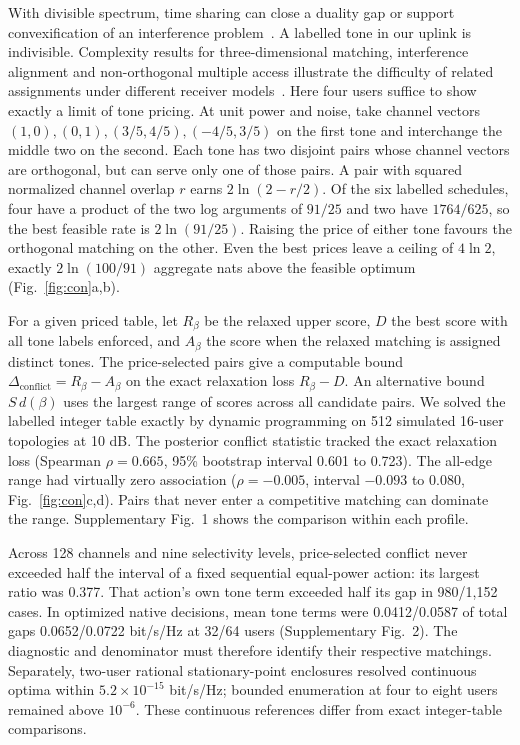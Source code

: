 \documentclass[lineno,pdflatex,sn-nature]{sn-jnl}
\begin{document}
With divisible spectrum, time sharing can close a duality gap or support convexification of an interference problem~\cite{yului,zhaopottie}. A labelled tone in our uplink is indivisible. Complexity results for three-dimensional matching, interference alignment and non-orthogonal multiple access illustrate the difficulty of related assignments under different receiver models~\cite{dyer,razaviyayn,salaun}. Here four users suffice to show exactly a limit of tone pricing. At unit power and noise, take channel vectors \((1,0),(0,1),(3/5,4/5),(-4/5,3/5)\) on the first tone and interchange the middle two on the second. Each tone has two disjoint pairs whose channel vectors are orthogonal, but can serve only one of those pairs. A pair with squared normalized channel overlap \(r\) earns \(2\ln(2-r/2)\). Of the six labelled schedules, four have a product of the two log arguments of \(91/25\) and two have \(1764/625\), so the best feasible rate is \(2\ln(91/25)\). Raising the price of either tone favours the orthogonal matching on the other. Even the best prices leave a ceiling of \(4\ln2\), exactly \(2\ln(100/91)\) aggregate nats above the feasible optimum (Fig.~\ref{fig:con}a,b).


For a given priced table, let \(R_\beta\) be the relaxed upper score, \(D\) the best score with all tone labels enforced, and \(A_\beta\) the score when the relaxed matching is assigned distinct tones. The price-selected pairs give a computable bound \(\Delta_{\mathrm{conflict}}=R_\beta-A_\beta\) on the exact relaxation loss \(R_\beta-D\). An alternative bound \(S\,d(\beta)\) uses the largest range of scores across all candidate pairs. We solved the labelled integer table exactly by dynamic programming on 512 simulated 16-user topologies at 10 dB. The posterior conflict statistic tracked the exact relaxation loss (Spearman \(\rho=0.665\), 95\% bootstrap interval 0.601 to 0.723). The all-edge range had virtually zero association (\(\rho=-0.005\), interval \(-0.093\) to \(0.080\), Fig.~\ref{fig:con}c,d). Pairs that never enter a competitive matching can dominate the range. Supplementary Fig.~1 shows the comparison within each profile.


Across 128 channels and nine selectivity levels, price-selected conflict never exceeded half the interval of a fixed sequential equal-power action: its largest ratio was 0.377. That action's own tone term exceeded half its gap in 980/1,152 cases. In optimized native decisions, mean tone terms were 0.0412/0.0587 of total gaps 0.0652/0.0722 bit/s/Hz at 32/64 users (Supplementary Fig.~2). The diagnostic and denominator must therefore identify their respective matchings. Separately, two-user rational stationary-point enclosures resolved continuous optima within \(5.2\times10^{-15}\) bit/s/Hz; bounded enumeration at four to eight users remained above \(10^{-6}\). These continuous references differ from exact integer-table comparisons.
\end{document}
